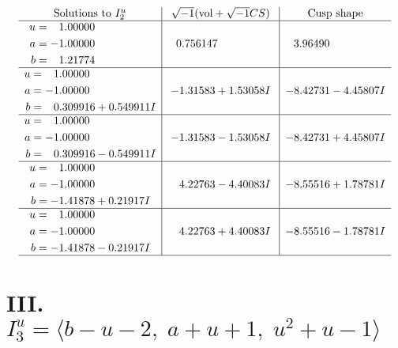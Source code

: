 \documentclass[1p]{elsarticle_modified}
\theoremstyle{definition}
\newcommand{\I}{\sqrt{-1}}
\begin{document}
$$\begin{array}{c|c|c}  
\text{Solutions to }I^u_{2}& \I (\text{vol} + \sqrt{-1}CS) & \text{Cusp shape}\\
 \hline 
\begin{aligned}
u &= \phantom{-}1.00000\phantom{ +0.000000I} \\
a &= -1.00000\phantom{ +0.000000I} \\
b &= \phantom{-}1.21774\phantom{ +0.000000I}\end{aligned}
 & \phantom{-}0.756147\phantom{ +0.000000I} & \phantom{-}3.96490\phantom{ +0.000000I} \\ \hline\begin{aligned}
u &= \phantom{-}1.00000\phantom{ +0.000000I} \\
a &= -1.00000\phantom{ +0.000000I} \\
b &= \phantom{-}0.309916 + 0.549911 I\end{aligned}
 & -1.31583 + 1.53058 I & -8.42731 - 4.45807 I \\ \hline\begin{aligned}
u &= \phantom{-}1.00000\phantom{ +0.000000I} \\
a &= -1.00000\phantom{ +0.000000I} \\
b &= \phantom{-}0.309916 - 0.549911 I\end{aligned}
 & -1.31583 - 1.53058 I & -8.42731 + 4.45807 I \\ \hline\begin{aligned}
u &= \phantom{-}1.00000\phantom{ +0.000000I} \\
a &= -1.00000\phantom{ +0.000000I} \\
b &= -1.41878 + 0.21917 I\end{aligned}
 & \phantom{-}4.22763 - 4.40083 I & -8.55516 + 1.78781 I \\ \hline\begin{aligned}
u &= \phantom{-}1.00000\phantom{ +0.000000I} \\
a &= -1.00000\phantom{ +0.000000I} \\
b &= -1.41878 - 0.21917 I\end{aligned}
 & \phantom{-}4.22763 + 4.40083 I & -8.55516 - 1.78781 I\\
 \hline 
 \end{array}$$\newpage\newpage\renewcommand{\arraystretch}{1}
\centering \section*{III. $I^u_{3}= \langle b- u-2,\;a+u+1,\;u^2+u-1 \rangle$}
\end{document}

